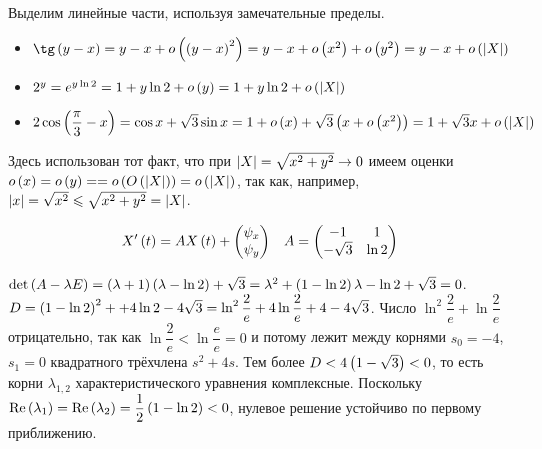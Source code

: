\documentclass[a5paper,10pt]{article}
\begin{document}
Выделим линейные части, используя замечательные пределы.
    
\begin{itemize}
    \item $\tg\br{y - x} = y - x + o\br{\br{y - x}^2} = y - x + o\br{x^2} + o\br{y^2} = y - x + o\br{\vbr{X}}$

    \item $2^{y} = e^{y \ln 2} = 1 + y \ln 2 + o\left(y\right) = 1 + y \ln 2 + o\left(\left|X\right|\right)$
    
    \item $2 \cos\left(\dfrac {\pi} {3} - x\right) = \cos x + \sqrt{3} \sin x = 1 + o\left(x\right) + \sqrt{3} \left(x + o\left(x^2\right)\right) = 1 + \sqrt{3}x + o\left(\left|X\right|\right)$
\end{itemize}

Здесь использован тот факт, что при $\left|X\right| = \sqrt{x^2 + y^2} \to 0$ имеем оценки $o\br{x} = o\br{y} = \linebreak = o\br{O\br{\vbr{X}}} = o\br{\vbr{X}}$, так как, например, $\left|x\right| = \sqrt{x^2} \leqslant \sqrt{x^2 + y^2} = \left|X\right|$.

\begin{align*}
    X'\left(t\right) = A X\left(t\right) + \begin{pmatrix} \psi_{x} \\ \psi_{y} \end{pmatrix} && A = \begin{pmatrix}-1 & 1 \\ -\sqrt{3} & \ln 2 \end{pmatrix}
\end{align*}

$\det\left(A - \lambda E\right) = \left(\lambda + 1\right) \left(\lambda - \ln 2\right) + \sqrt{3} = \lambda^2 + \left(1 - \ln 2\right)\lambda - \ln 2 + \sqrt{3} = 0$. $D = \br{1 - \ln 2}^2 + \linebreak + 4\ln 2 - 4\sqrt{3} = \ln^2 \dfrac {2} {e} + 4\ln \dfrac {2} {e} + 4 - 4\sqrt{3}$. Число $\ln^2 \dfrac {2} {e} + \ln \dfrac {2} {e}$ отрицательно, так как $\ln \dfrac {2} {e} < \ln \dfrac {e} {e} = 0$ и потому лежит между корнями $s_{0} = -4$, $s_{1} = 0$ квадратного трёхчлена $s^2 + 4s$. Тем более $D < 4 \left(1 - \sqrt{3}\right) < 0$, то есть корни $\lambda_{1, 2}$ характеристического уравнения комплексные. Поскольку $\operatorname{Re}\left(\lambda_{1}\right) = \operatorname{Re}\left(\lambda_{2}\right) = \dfrac {1} {2} \left(1 - \ln 2\right) < 0$, нулевое решение устойчиво по первому приближению. 
\end{document}
